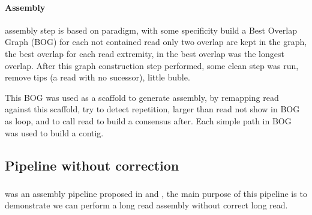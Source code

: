 \documentclass[main]{subfiles}
\begin{document}
\paragraph{Assembly}

\canu assembly step is based on \OLC paradigm, with some specificity \canu build a Best Overlap Graph (BOG) for each not contained read only two overlap are kept in the graph, the best overlap for each read extremity, in \canu the best overlap was the longest overlap. After this graph construction step performed, some clean step was run, remove tips (a read with no sucessor), little buble.

This BOG was used as a scaffold to generate assembly, by remapping read against this scaffold, \canu try to detect repetition, larger than read not show in BOG as loop, and to call read to build a consensus after. Each simple path in BOG was used to build a contig. 


\subsection{Pipeline without correction}

\subsubsection{\miniasm} \label{subsubsec:sota:miniasm}

\miniasm \minimap was an assembly pipeline proposed in \cite{miniasm_minimap} and \cite{minimap2}, the main purpose of this pipeline is to demonstrate we can perform a long read assembly without correct long read.

\paragraph{\minimap}

\paragraph{\miniasm}

\subsubsection{\hinge}

\subsubsection{\wtdbg}
\end{document}
